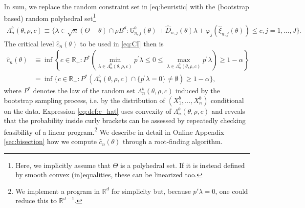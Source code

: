 \documentclass[letterpaper,11pt]{article}
\theoremstyle{myplain}
\theoremstyle{mydefinition}
\theoremstyle{myremark}
\numberwithin{equation}{section}
\numberwithin{figure}{section}
\begin{document}
In sum, we replace the random constraint set in \eqref{eq:heuristic} with the (bootstrap based) random polyhedral set\footnote{Here, we implicitly assume that $\Theta$ is a polyhedral set. If it is instead defined by smooth convex (in)equalities, these can be linearized too.}
\begin{align}
\Lambda_n^b (\theta, \rho ,c)
\equiv \bigl\{ \lambda \in \sqrt{n}(\Theta-\theta) \cap \rho B^{d}:\mathbb{G}_{n,j}^{b}(\theta )+\hat{D}
_{n,j}(\theta)\lambda +\varphi_j(\hat{\xi}_{n,j}(\theta))\leq c,j=1,\dots,J\bigr\} \label{eq:Lambda_n}.
\end{align}
The critical level $\hat{c}_n(\theta)$ to be used in \eqref{eq:CI} then is
\begin{align}
\hat c_n(\theta)&\equiv \inf\left\{c\in\mathbb R_+:P^*\left(\min_{\lambda \in \Lambda_n^b (\theta ,\rho ,c)}p^{\prime }\lambda \leq 0\leq \max_{\lambda \in \Lambda_n^b (\theta ,\rho ,c)}p^{\prime }\lambda\right)\ge 1-\alpha\right\} \label{eq:event_kms} \\
&= \inf\bigl\{c\in\mathbb R_+:P^*(\Lambda_n^b (\theta ,\rho ,c)\cap \{p^{\prime }\lambda =0\}\neq \emptyset)\ge 1-\alpha\bigr\},\label{eq:def:c_hat}
\end{align}
where $P^*$ denotes the law of the random set $\Lambda_n^b (\theta ,\rho ,c)$ induced by the bootstrap sampling process, i.e. by the distribution of $(X_1^b,\dots,X_n^b)$ conditional on the data. Expression \eqref{eq:def:c_hat} uses convexity of $\Lambda_n^b (\theta, \rho ,c)$ and reveals that the probability inside curly brackets can be assessed by repeatedly checking feasibility of a linear program.\footnote{We implement a program in $\mathbb{R}^d$ for simplicity but, because $p'\lambda=0$,  
one could reduce this to $\mathbb{R}^{d-1}$.} We describe in detail in Online Appendix \ref{sec:bisection} how we compute $\hat{c}_n(\theta)$ through a root-finding algorithm.
\end{document}
